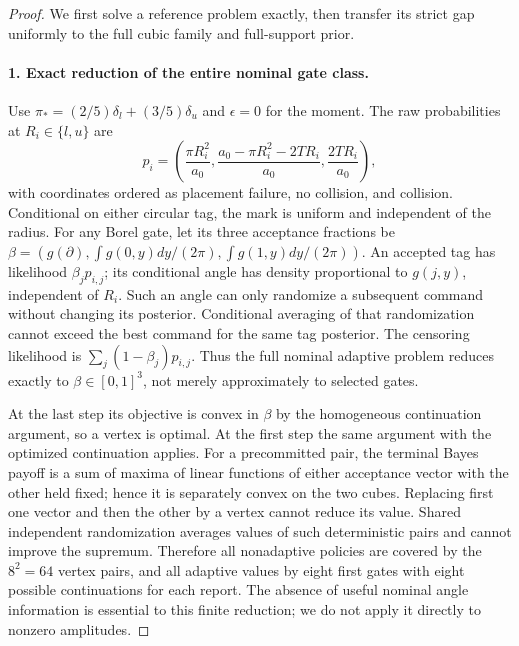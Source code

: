 \begin{proof}
We first solve a reference problem exactly, then transfer its strict gap
uniformly to the full cubic family and full-support prior.

\paragraph{1. Exact reduction of the entire nominal gate class.}
Use $\pi_*=(2/5)\delta_l+(3/5)\delta_u$ and $\epsilon=0$ for the moment.
The raw probabilities at $R_i\in\{l,u\}$ are
\[
 p_i=\left(\frac{\pi R_i^2}{a_0},
       \frac{a_0-\pi R_i^2-2TR_i}{a_0},\frac{2TR_i}{a_0}\right),
\]
with coordinates ordered as placement failure, no collision, and collision.
Conditional on either circular tag, the mark is uniform and independent
of the radius. For any Borel gate, let its three acceptance fractions be
$\beta=(g(\partial),\int g(0,y)dy/(2\pi),\int g(1,y)dy/(2\pi))$.
An accepted tag has likelihood $\beta_j p_{i,j}$; its conditional angle
has density proportional to $g(j,y)$, independent of $R_i$. Such an angle
can only randomize a subsequent command without changing its posterior.
Conditional averaging of that randomization cannot exceed the best command
for the same tag posterior. The censoring likelihood is
$\sum_j(1-\beta_j)p_{i,j}$. Thus the full nominal adaptive problem reduces
exactly to $\beta\in[0,1]^3$, not merely approximately to selected gates.

At the last step its objective is convex in $\beta$ by the homogeneous
continuation argument, so a vertex is optimal. At the first step the same
argument with the optimized continuation applies. For a precommitted pair,
the terminal Bayes payoff is a sum of maxima of linear functions of either
acceptance vector with the other held fixed; hence it is separately convex
on the two cubes. Replacing first one vector and then the other by a vertex
cannot reduce its value. Shared independent randomization averages values
of such deterministic pairs and cannot improve the supremum. Therefore all
nonadaptive policies are covered by the $8^2=64$ vertex pairs, and all
adaptive values by eight first gates with eight possible continuations for
each report. The absence of useful nominal angle information is essential
to this finite reduction; we do not apply it directly to nonzero amplitudes.


\end{proof}
